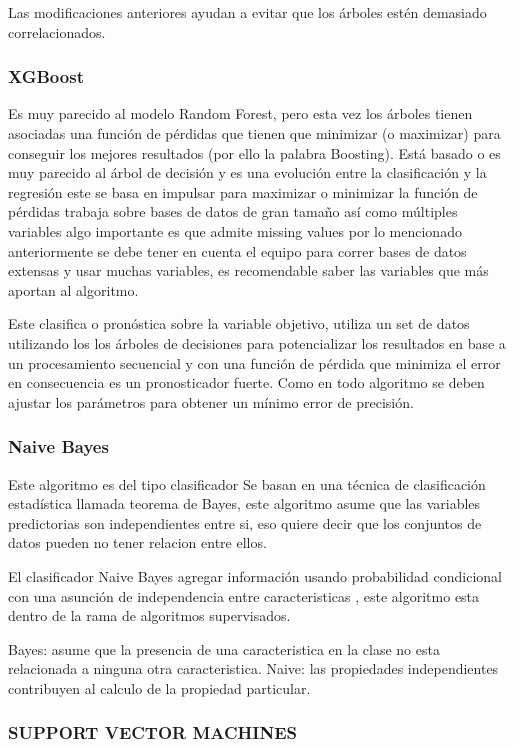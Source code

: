 Las modificaciones anteriores ayudan a evitar que los \'arboles est\'en demasiado correlacionados. \cite{breiman2001random}

\subsubsection{XGBoost}
Es muy parecido al modelo Random Forest, pero esta vez los \'arboles tienen asociadas una funci\'on de p\'erdidas que tienen que minimizar (o maximizar) para conseguir los mejores resultados (por ello la palabra Boosting).
Est\'a basado o es muy parecido al \'arbol de decisi\'on y es una evoluci\'on entre la clasificaci\'on y la regresi\'on  este se basa en impulsar  para maximizar o minimizar la funci\'on de p\'erdidas trabaja sobre bases de datos de gran tamaño as\'i como m\'ultiples variables algo importante es que admite missing values  por lo mencionado anteriormente se debe tener en cuenta el equipo para  correr bases de datos extensas y usar muchas variables, es recomendable saber las variables que m\'as aportan al algoritmo.

Este clasifica o pron\'ostica sobre la variable objetivo, utiliza un set de datos utilizando los los \'arboles de decisiones para potencializar los resultados en base a un procesamiento secuencial y con una funci\'on de p\'erdida  que minimiza el error en consecuencia es un pronosticador fuerte. Como en todo algoritmo se deben ajustar los par\'ametros para obtener un m\'inimo error de precisi\'on.

\subsubsection{Naive Bayes}
Este algoritmo es del tipo clasificador Se basan en una t\'ecnica de clasificaci\'on estad\'istica llamada teorema de Bayes, este algoritmo asume que las variables predictorias son independientes entre si, eso quiere decir que los conjuntos de datos pueden no tener relacion entre ellos.

El clasificador Naive Bayes agregar informaci\'on usando probabilidad condicional con una asunci\'on de independencia entre caracteristicas , este algoritmo esta dentro de la rama de algoritmos supervisados.

Bayes: asume que la presencia de una caracteristica en la clase no esta relacionada a ninguna otra caracteristica.
Naive: las propiedades independientes contribuyen al calculo de la propiedad particular.

\subsubsection{SUPPORT VECTOR MACHINES}

